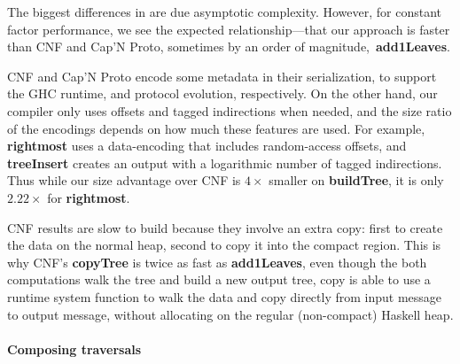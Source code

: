 The biggest differences in  are due
asymptotic complexity.
However, for constant factor performance, we see the expected
relationship---that our approach is faster than CNF and Cap'N Proto,
sometimes by an order of magnitude, \eg\,{\bf add1Leaves}.

CNF and Cap'N Proto encode some metadata in their serialization, to
support the GHC runtime, and protocol evolution, respectively.
On the other hand,
our compiler only uses offsets and tagged indirections
when needed, and the size ratio of the encodings depends on how much these features are used.
%
For example, {\bf rightmost} uses a data-encoding that includes random-access
offsets, and {\bf treeInsert} creates an output with a logarithmic number of
tagged indirections.  Thus while our size advantage over CNF is
%
$4\times$ smaller
%
on {\bf buildTree}, it is only
%
$2.22\times$
%
for {\bf rightmost}.

CNF results are slow to build because they involve an extra copy: first to
create the data on the normal heap, second to copy it into the compact region.
This is why CNF's {\bf copyTree} is twice as fast as {\bf add1Leaves}, even
though the both computations walk the tree and build a new output tree, copy is
able to use a runtime system function to walk the data and copy directly from
input message to output message, without allocating on the regular (non-compact)
Haskell heap.

\paragraph{Composing traversals}

